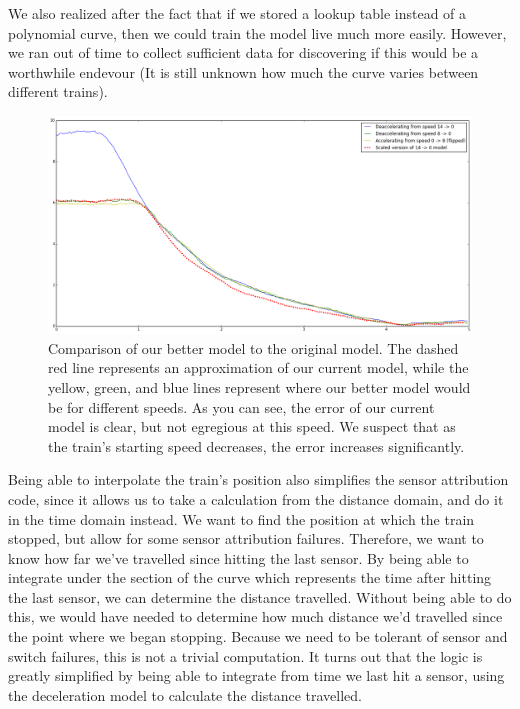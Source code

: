 \documentclass{article}
\begin{document}
We also realized after the fact that if we stored a lookup table instead of a
polynomial curve, then we could train the model live much more easily.
However, we ran out of time to collect sufficient data for discovering if
this would be a worthwhile endevour (It is still unknown how much the curve
varies between different trains).

\begin{figure}
\caption{Comparison of our better model to the original model. The dashed red
line represents an approximation of our current model, while the yellow, green,
and blue lines represent where our better model would be for different speeds.
As you can see, the error of our current model is clear, but not egregious at
this speed. We suspect that as the train's starting speed decreases,
the error increases significantly.}
\label{fig:better-deceleration}
\includegraphics[width=\linewidth]{better-deceleration.png}
\end{figure}

Being able to interpolate the train's position
also simplifies the sensor attribution code, since it allows
us to take a calculation from the distance domain, and do it in
the time domain instead.
We want to find the position at which the train stopped, but allow
for some sensor attribution failures.
Therefore, we want to know how far we've travelled since hitting the last sensor.
By being able to integrate under the section of the curve which represents
the time after hitting the last sensor, we can determine the distance travelled.
Without being able to do this, we would have needed to determine how much distance we'd
travelled since the point where we began stopping.
Because we need to be tolerant of sensor and switch failures, this is not a trivial computation.
It turns out that the logic is greatly simplified by being able to integrate from time
we last hit a sensor, using the deceleration model to calculate the distance travelled.
\end{document}
